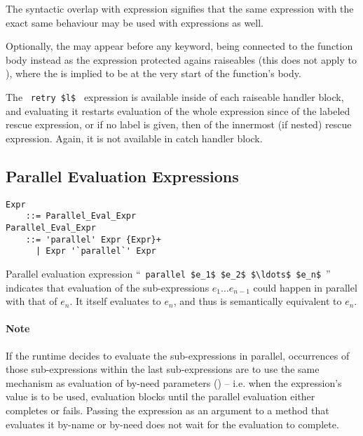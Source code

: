 The syntactic overlap with  expression signifies that the same expression with the exact same behaviour may be used with  expressions as well. 

Optionally, the  may appear before any  keyword, being connected to the function body instead as the expression protected agains raiseables (this does not apply to ), where the  is implied to be at the very start of the function's body. 

The ~\lstinline!retry $l$!~ expression is available inside of each raiseable handler block, and evaluating it restarts evaluation of the whole expression since  of the labeled rescue expression, or if no label is given, then of the innermost (if nested) rescue expression. Again, it is not available in catch handler block. 






\subsection{Parallel Evaluation Expressions}
\label{sec:parallel-eval}

\grammar\begin{lstlisting}
Expr 
    ::= Parallel_Eval_Expr
Parallel_Eval_Expr
    ::= 'parallel' Expr {Expr}+
      | Expr '`parallel`' Expr
\end{lstlisting}

Parallel evaluation expression ``~\lstinline!parallel $e_1$ $e_2$ $\ldots$ $e_n$!~'' indicates that evaluation of the sub-expressions $e_1 \ldots e_{n-1}$ could happen in parallel with that of $e_n$. It itself evaluates to $e_n$, and thus is semantically equivalent to $e_n$.

\paragraph{Note} 
If the runtime decides to evaluate the sub-expressions in parallel, occurrences of those sub-expressions within the last sub-expressions are to use the same mechanism as evaluation of by-need parameters () -- i.e. when the expression's value is to be used, evaluation blocks until the parallel evaluation either completes or fails. Passing the expression as an argument to a method that evaluates it by-name or by-need does not wait for the evaluation to complete.





